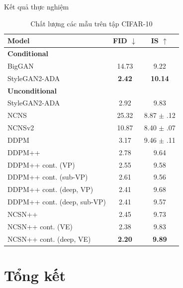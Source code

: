 \documentclass[10pt]{beamer}
\theoremstyle{remark}
\numberwithin{algocf}{section}
\numberwithin{equation}{section}
\numberwithin{dl}{section}
\numberwithin{figure}{section}
\begin{document}
\begin{frame}[shrink]{Kết quả thực nghiệm}
	\begin{table}[H]
		\centering
		\caption{Chất lượng các mẫu trên tập CIFAR-10}
		\begin{tabular}{lcc}
			\hline
			Model & FID $\downarrow$ & IS $\uparrow$ \\
			\hline
			\textbf{Conditional} & & \\
			BigGAN \citep{brock2018large} &  14.73 & 9.22 \\
			StyleGAN2-ADA \citep{karras2020training} & \textbf{2.42} & \textbf{10.14} \\
			\hline
			\textbf{Unconditional} & & \\
			StyleGAN2-ADA \citep{karras2020training} & 2.92 & 9.83 \\
			NCNS \citep{song2019generative} & 25.32 & 8.87 $\pm$ .12 \\
			NCNSv2 \citep{song2020improved} & 10.87 & 8.40 $\pm$ .07 \\
			DDPM \citep{ho2020denoising} & 3.17 & 9.46 $\pm$ .11 \\
			\hline
			DDPM++ & 2.78 & 9.64 \\
			DDPM++ cont. (VP) & 2.55 & 9.58 \\
			DDPM++ cont. (sub-VP) & 2.61 & 9.56 \\
			DDPM++ cont. (deep, VP) & 2.41 & 9.68 \\
			DDPM++ cont. (deep, sub-VP) & 2.41 & 9.57 \\
			NCSN++ & 2.45 & 9.73 \\
			NCSN++ cont. (VE) & 2.38 & 9.83 \\
			NCSN++ cont. (deep, VE) & \textbf{2.20} & \textbf{9.89} \\
			\hline
		\end{tabular}
		\label{tab:3}
	\end{table}
\end{frame}

\section{Tổng kết}
\end{document}
